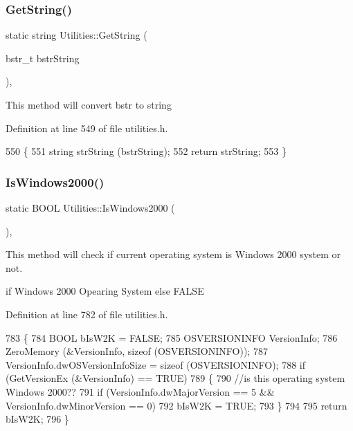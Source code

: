 \subsubsection{\texorpdfstring{Get\+String()}{GetString()}}
{\footnotesize\ttfamily static string Utilities\+::\+Get\+String (\begin{DoxyParamCaption}\item[{bstr\+\_\+t}]{bstr\+String }\end{DoxyParamCaption})\hspace{0.3cm}{\ttfamily [inline]}, {\ttfamily [static]}}

This method will convert bstr to string

Definition at line 549 of file utilities.\+h.


\begin{DoxyCode}
550     \{
551         \textcolor{keywordtype}{string} strString (bstrString);
552         \textcolor{keywordflow}{return} strString;
553     \}
\end{DoxyCode}
\mbox{\label{class_utilities_a5037cc6bc036044928fbb0c4d6d90df9_a5037cc6bc036044928fbb0c4d6d90df9}} 
\subsubsection{\texorpdfstring{Is\+Windows2000()}{IsWindows2000()}}
{\footnotesize\ttfamily static B\+O\+OL Utilities\+::\+Is\+Windows2000 (\begin{DoxyParamCaption}{ }\end{DoxyParamCaption})\hspace{0.3cm}{\ttfamily [inline]}, {\ttfamily [static]}}

This method will check if current operating system is Windows 2000 system or not.

if Windows 2000 Opearing System else F\+A\+L\+SE 

Definition at line 782 of file utilities.\+h.


\begin{DoxyCode}
783     \{
784         BOOL bIsW2K = FALSE;
785         OSVERSIONINFO VersionInfo;
786         ZeroMemory (&VersionInfo, \textcolor{keyword}{sizeof} (OSVERSIONINFO));
787         VersionInfo.dwOSVersionInfoSize = \textcolor{keyword}{sizeof} (OSVERSIONINFO);
788         \textcolor{keywordflow}{if} (GetVersionEx (&VersionInfo) == TRUE)
789         \{
790             \textcolor{comment}{//is this operating system Windows 2000??}
791             \textcolor{keywordflow}{if} (VersionInfo.dwMajorVersion == 5 && VersionInfo.dwMinorVersion == 0)
792                 bIsW2K = TRUE;
793         \}
794 
795         \textcolor{keywordflow}{return} bIsW2K;
796     \}
\end{DoxyCode}
\mbox{\label{class_utilities_ac2d9ddd205aa23ab4239fe8761a16283_ac2d9ddd205aa23ab4239fe8761a16283}} 

